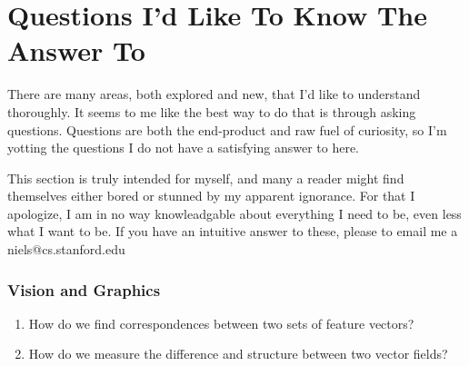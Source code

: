 
\chapter{Questions I'd Like To Know The Answer To}

There are many areas, both explored and new, that I'd like to understand thoroughly. It seems to me like the best way to do that is through asking questions. Questions are both the end-product and raw fuel of curiosity, so I'm yotting the questions I do not have a satisfying answer to here.

This section is truly intended for myself, and many a reader might find themselves either bored or stunned by my apparent ignorance. For that I apologize, I am in no way knowleadgable about everything I need to be, even less what I want to be. If you have an intuitive answer to these, please to email me a niels@cs.stanford.edu

\subsection{}

\subsection{Vision and Graphics}

\begin{enumerate}

\item How do we find correspondences between two sets of feature vectors?

\item How do we measure the difference and structure between two vector fields?

\end{enumerate}

